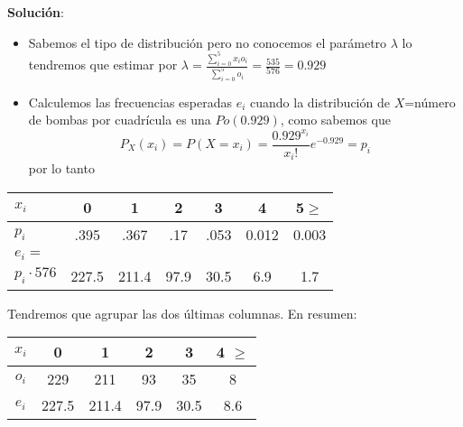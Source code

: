 \begin{frame}  
\textbf{Solución}:
\begin{itemize}
\item Sabemos el tipo de distribución pero no conocemos el parámetro $\lambda$ lo tendremos que estimar por
           $\lambda=\frac{\sum_{i=0}^{5} x_{i } o_{i}}{\sum_{i=0}^5
           o_{i}}=\frac{535}{576}=0.929$

\item Calculemos las frecuencias esperadas $e_{i}$ cuando la  distribución de $X$=número de bombas por cuadrícula es una $Po(0.929)$, como sabemos que  $$P_{X}(x_{i})=P(X=x_{i})=\frac{{0.929}^{x_{i}}}{x_{i}!} e^{-0.929}=p_{i}$$
por lo tanto
\end{itemize}
\end{frame}

\begin{frame}     
\begin{center}
 \begin{tabular}{|l|cccccc|}
           \hline
           $x_{i}$ & 0 & 1 & 2 & 3 & 4 & 5$\geq$  \\
           \hline
           $p_{i}$&  .395  & .367  & .17 & .053  & 0.012  &
           0.003 \\
           \hline
           $e_{i}=$ & & & & & &  \\
            $p_{i}\cdot 576$ & 227.5 &  211.4   &  97.9   & 30.5  & 6.9& 1.7\\
           \hline
    \end{tabular}
\end{center}
\end{frame}

\begin{frame}
Tendremos que agrupar las dos últimas columnas. En resumen:

\begin{center}
           \begin{tabular}{|c|ccccc|}
               \hline
               $x_{i}$ & 0 & 1 & 2 & 3 & 4 $\geq$ \\
               \hline
               $o_{i}$ & 229 & 211 & 93 &35 & 8\\
               \hline
               $e_{i}$ & 227.5 &  211.4   &  97.9 & 30.5 & 8.6\\ \hline
               \end{tabular}
\end{center}
\end{frame}


